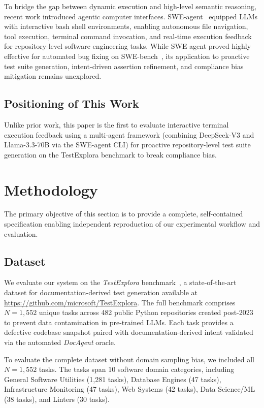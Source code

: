 \documentclass[conference]{IEEEtran}
\begin{document}
To bridge the gap between dynamic execution and high-level semantic reasoning, recent work introduced agentic computer interfaces. SWE-agent~\cite{sweagent} equipped LLMs with interactive bash shell environments, enabling autonomous file navigation, tool execution, terminal command invocation, and real-time execution feedback for repository-level software engineering tasks. While SWE-agent proved highly effective for automated bug fixing on SWE-bench~\cite{swebench}, its application to proactive test suite generation, intent-driven assertion refinement, and compliance bias mitigation remains unexplored.

\subsection{Positioning of This Work}
Unlike prior work, this paper is the first to evaluate interactive terminal execution feedback using a multi-agent framework (combining DeepSeek-V3 and Llama-3.3-70B via the SWE-agent CLI) for proactive repository-level test suite generation on the TestExplora benchmark to break compliance bias.

\section{Methodology}
\label{sec:method}

The primary objective of this section is to provide a complete, self-contained specification enabling independent reproduction of our experimental workflow and evaluation.

\subsection{Dataset}
\label{subsec:dataset}
We evaluate our system on the \textit{TestExplora} benchmark~\cite{testexplora}, a state-of-the-art dataset for documentation-derived test generation available at \url{https://github.com/microsoft/TestExplora}. The full benchmark comprises $N=1,552$ unique tasks across 482 public Python repositories created post-2023 to prevent data contamination in pre-trained LLMs. Each task provides a defective codebase snapshot paired with documentation-derived intent validated via the automated \textit{DocAgent} oracle. 

To evaluate the complete dataset without domain sampling bias, we included all $N=1,552$ tasks. The tasks span 10 software domain categories, including General Software Utilities (1,281 tasks), Database Engines (47 tasks), Infrastructure Monitoring (47 tasks), Web Systems (42 tasks), Data Science/ML (38 tasks), and Linters (30 tasks).
\end{document}
